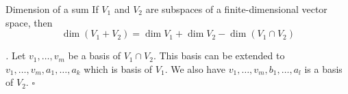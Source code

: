 \documentclass[11pt]{article}
\renewenvironment{proof}[1][\proofname]{\par\noindent\textit{#1.} }{\hfill$\square$\par}
\begin{document}
\begin{theorem}{Dimension of a sum}
  If $V_1$ and $V_2$ are subspaces of a finite-dimensional vector space, then
  \[
    \dim(V_1 + V_2) = \dim V_1 + \dim V_2 - \dim(V_1 \cap V_2)
  \]
\end{theorem}
\begin{proof}
  Let $v_1,\dots,v_m$ be a basis of $V_1 \cap V_2$. This basis can be extended to $v_1,\dots,v_m, a_1 , \dots,a_k$ which is basis of $V_1$. We also have $v_1,\dots,v_m, b_1 , \dots,a_l$ is a basis of $V_2$.
\end{proof}
\end{document}
